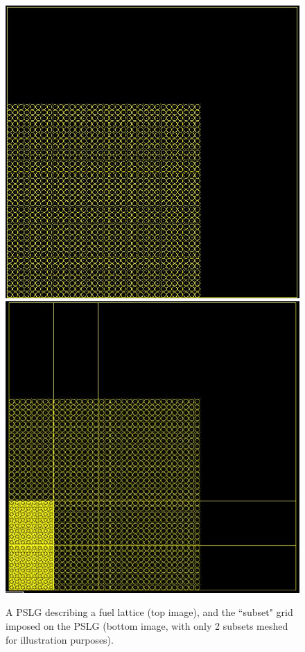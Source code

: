 \documentclass{anstrans}
\begin{document}
\begin{figure}[H]
\centering
\includegraphics[scale = 0.45]{figures/lattice.png}
\includegraphics[scale = 0.45]{figures/subsetlattice.png}
\caption{A PSLG describing a fuel lattice (top image), and the ``subset" grid imposed on the PSLG (bottom image, with only 2 subsets meshed for illustration purposes).}
\label{grid}
\end{figure}
\end{document}
